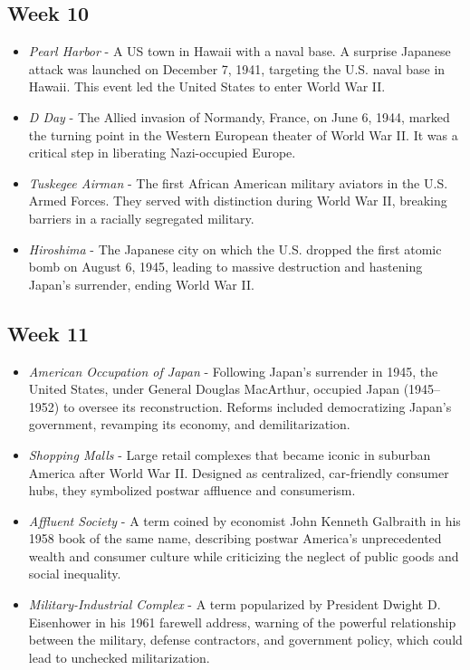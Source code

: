 \documentclass[12pt]{article}
\begin{document}
\subsection*{Week 10}

\begin{itemize}
    \item\textit{Pearl Harbor} - A US town in Hawaii with a naval base. A surprise Japanese attack was launched on December 7, 1941, targeting the U.S. naval base in Hawaii. This event led the United States to enter World War II.

    \item\textit{D Day} - The Allied invasion of Normandy, France, on June 6, 1944, marked the turning point in the Western European theater of World War II. It was a critical step in liberating Nazi-occupied Europe.
    
    \item\textit{Tuskegee Airman} - The first African American military aviators in the U.S. Armed Forces. They served with distinction during World War II, breaking barriers in a racially segregated military.
    
    \item\textit{Hiroshima} - The Japanese city on which the U.S. dropped the first atomic bomb on August 6, 1945, leading to massive destruction and hastening Japan’s surrender, ending World War II.
\end{itemize}

\subsection*{Week 11}

\begin{itemize}
    \item\textit{American Occupation of Japan} - Following Japan's surrender in 1945, the United States, under General Douglas MacArthur, occupied Japan (1945–1952) to oversee its reconstruction. Reforms included democratizing Japan’s government, revamping its economy, and demilitarization.
    
    \item\textit{Shopping Malls} - Large retail complexes that became iconic in suburban America after World War II. Designed as centralized, car-friendly consumer hubs, they symbolized postwar affluence and consumerism.
    
    \item\textit{Affluent Society} - A term coined by economist John Kenneth Galbraith in his 1958 book of the same name, describing postwar America’s unprecedented wealth and consumer culture while criticizing the neglect of public goods and social inequality.
    
    \item\textit{Military-Industrial Complex} - A term popularized by President Dwight D. Eisenhower in his 1961 farewell address, warning of the powerful relationship between the military, defense contractors, and government policy, which could lead to unchecked militarization.
\end{itemize}
\end{document}
